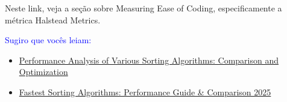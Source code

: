 Neste link, veja a seção sobre Measuring Ease of Coding, especificamente a métrica  Halstead Metrics.

\textcolor{blue}{Sugiro que vocês leiam:}
\begin{itemize}
\item 
\href{https://ieeexplore.ieee.org/document/10444609}{Performance Analysis of Various Sorting Algorithms: Comparison and Optimization}

\item
\href{https://www.devzery.com/post/fastest-sorting-algorithms-performance-guide-2025}{Fastest Sorting Algorithms: Performance Guide \& Comparison 2025}
\end{itemize}

